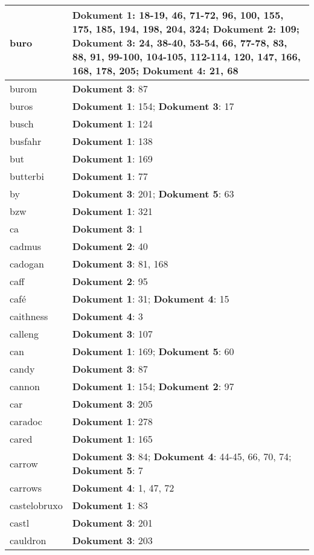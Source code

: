 \documentclass[a5paper]{article}
\begin{document}
\begin{longtable}[l]{|l|p{3in}|}
\hline
buro & \textbf{Dokument 1}: 18-19, 46, 71-72, 96, 100, 155, 175, 185, 194, 198, 204, 324; \textbf{Dokument 2}: 109; \textbf{Dokument 3}: 24, 38-40, 53-54, 66, 77-78, 83, 88, 91, 99-100, 104-105, 112-114, 120, 147, 166, 168, 178, 205; \textbf{Dokument 4}: 21, 68 \\
\hline
burom & \textbf{Dokument 3}: 87 \\
\hline
buros & \textbf{Dokument 1}: 154; \textbf{Dokument 3}: 17 \\
\hline
busch & \textbf{Dokument 1}: 124 \\
\hline
busfahr & \textbf{Dokument 1}: 138 \\
\hline
but & \textbf{Dokument 1}: 169 \\
\hline
butterbi & \textbf{Dokument 1}: 77 \\
\hline
by & \textbf{Dokument 3}: 201; \textbf{Dokument 5}: 63 \\
\hline
bzw & \textbf{Dokument 1}: 321 \\
\hline
ca & \textbf{Dokument 3}: 1 \\
\hline
cadmus & \textbf{Dokument 2}: 40 \\
\hline
cadogan & \textbf{Dokument 3}: 81, 168 \\
\hline
caff & \textbf{Dokument 2}: 95 \\
\hline
café & \textbf{Dokument 1}: 31; \textbf{Dokument 4}: 15 \\
\hline
caithness & \textbf{Dokument 4}: 3 \\
\hline
calleng & \textbf{Dokument 3}: 107 \\
\hline
can & \textbf{Dokument 1}: 169; \textbf{Dokument 5}: 60 \\
\hline
candy & \textbf{Dokument 3}: 87 \\
\hline
cannon & \textbf{Dokument 1}: 154; \textbf{Dokument 2}: 97 \\
\hline
car & \textbf{Dokument 3}: 205 \\
\hline
caradoc & \textbf{Dokument 1}: 278 \\
\hline
cared & \textbf{Dokument 1}: 165 \\
\hline
carrow & \textbf{Dokument 3}: 84; \textbf{Dokument 4}: 44-45, 66, 70, 74; \textbf{Dokument 5}: 7 \\
\hline
carrows & \textbf{Dokument 4}: 1, 47, 72 \\
\hline
castelobruxo & \textbf{Dokument 1}: 83 \\
\hline
castl & \textbf{Dokument 3}: 201 \\
\hline
cauldron & \textbf{Dokument 3}: 203 \\

\end{longtable}
\end{document}
